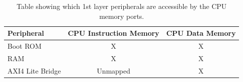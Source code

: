\begin{table}[H]
\centering
\begin{tabular}{lcc}
Peripheral       & \multicolumn{1}{l}{CPU Instruction Memory} & \multicolumn{1}{l}{CPU Data Memory} \\ \hline
Boot ROM         & X                                          & X                                   \\
RAM              & X                                          & X                                   \\
AXI4 Lite Bridge & Unmapped                                   & X
\end{tabular}
\caption{
Table showing which 1st layer peripherals are accessible by the
CPU memory ports.
}
\end{table}

